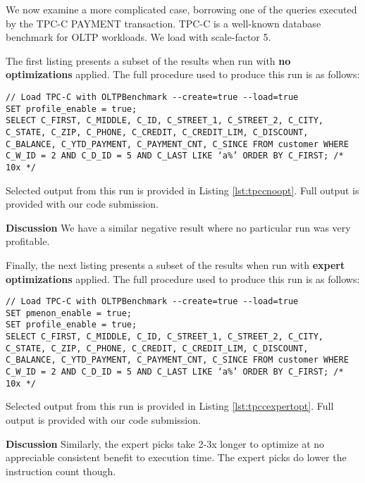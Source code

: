 \documentclass{vldb}
\begin{document}
We now examine a more complicated case, borrowing one of the queries executed by the TPC-C \cite{tpcc} PAYMENT transaction. TPC-C is a well-known database benchmark for OLTP workloads. We load with scale-factor 5.

The first listing presents a subset of the results when run with \textbf{no optimizations} applied. The full procedure used to produce this run is as follows:
\begin{lstlisting}
// Load TPC-C with OLTPBenchmark --create=true --load=true
SET profile_enable = true;
SELECT C_FIRST, C_MIDDLE, C_ID, C_STREET_1, C_STREET_2, C_CITY, C_STATE, C_ZIP, C_PHONE, C_CREDIT, C_CREDIT_LIM, C_DISCOUNT, C_BALANCE, C_YTD_PAYMENT, C_PAYMENT_CNT, C_SINCE FROM customer WHERE C_W_ID = 2 AND C_D_ID = 5 AND C_LAST LIKE ‘a%’ ORDER BY C_FIRST; /* 10x */
\end{lstlisting}

Selected output from this run is provided in Listing \ref{lst:tpccnoopt}. Full output is provided with our code submission.

\textbf{Discussion} We have a similar negative result where no particular run was very profitable. \linebreak

Finally, the next listing presents a subset of the results when run with \textbf{expert optimizations} applied. The full procedure used to produce this run is as follows:
\begin{lstlisting}
// Load TPC-C with OLTPBenchmark --create=true --load=true
SET pmenon_enable = true;
SET profile_enable = true;
SELECT C_FIRST, C_MIDDLE, C_ID, C_STREET_1, C_STREET_2, C_CITY, C_STATE, C_ZIP, C_PHONE, C_CREDIT, C_CREDIT_LIM, C_DISCOUNT, C_BALANCE, C_YTD_PAYMENT, C_PAYMENT_CNT, C_SINCE FROM customer WHERE C_W_ID = 2 AND C_D_ID = 5 AND C_LAST LIKE ‘a%’ ORDER BY C_FIRST; /* 10x */
\end{lstlisting}

Selected output from this run is provided in Listing \ref{lst:tpccexpertopt}. Full output is provided with our code submission.

\textbf{Discussion} Similarly, the expert picks take 2-3x longer to optimize at no appreciable consistent benefit to execution time. The expert picks do lower the instruction count though.

\end{document}
